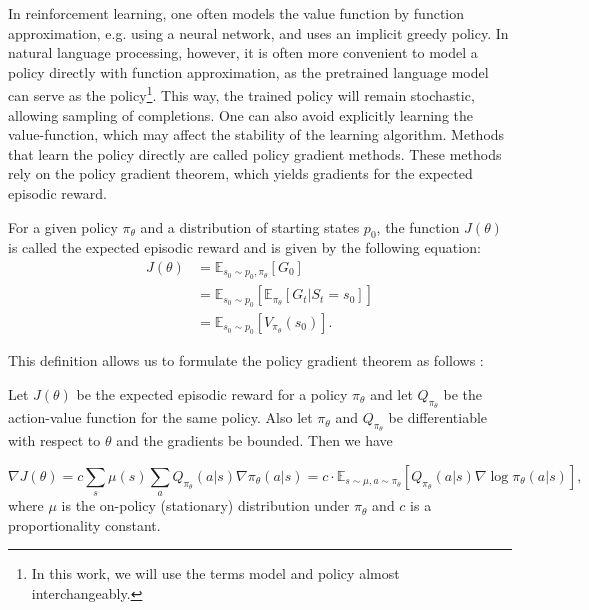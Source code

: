 In reinforcement learning, one often models the value function by function approximation, e.g. using a neural network, and uses an implicit greedy policy. In natural language processing, however, it is often more convenient to model a policy directly with function approximation, as the pretrained language model can serve as the policy\protect\footnote{In this work, we will use the terms model and policy almost interchangeably.}. This way, the trained policy will remain stochastic, allowing sampling of completions. One can also avoid explicitly learning the value-function, which may affect the stability of the learning algorithm. Methods that learn the policy directly are called policy gradient methods. These methods rely on the policy gradient theorem, which yields gradients for the expected episodic reward.

\begin{definition}
    For a given policy $\pi_\theta$ and a distribution of starting states $p_0$, the function $J(\theta)$ is called the expected episodic reward and is given by the following equation:
    \begin{align*}
        J(\theta) & = \mathbb{E}_{s_0\sim p_0,\pi_\theta}[G_0]                           \\
                  & = \mathbb{E}_{s_0\sim p_0}[\mathbb{E}_{\pi_\theta}[G_t | S_t = s_0]] \\
                  & = \mathbb{E}_{s_0\sim p_0}[V_{\pi_\theta}(s_0)].
    \end{align*}
\end{definition}

This definition allows us to formulate the policy gradient theorem as follows \cite{SuttonPolicyGradientTheorem, SuttonAndBarto2018}:


\begin{theorem}
    Let $J(\theta)$ be the expected episodic reward for a policy $\pi_\theta$ and let $Q_{\pi_\theta}$ be the action-value function for the same policy. Also let $\pi_\theta$ and $Q_{\pi_\theta}$ be differentiable with respect to $\theta$ and the gradients be bounded. Then we have

    \begin{equation}
        \nabla J(\theta) = c\sum_s\mu(s)\sum_a Q_{\pi_\theta}(a | s)\nabla\pi_\theta(a | s) = c\cdot\mathbb{E}_{s\sim\mu,a\sim\pi_\theta}[Q_{\pi_\theta}(a | s)\nabla\log\pi_\theta(a | s)],
    \end{equation}
    where $\mu$ is the on-policy (stationary) distribution under $\pi_\theta$ and $c$ is a proportionality constant.

    \label{th:PGT}
\end{theorem}

